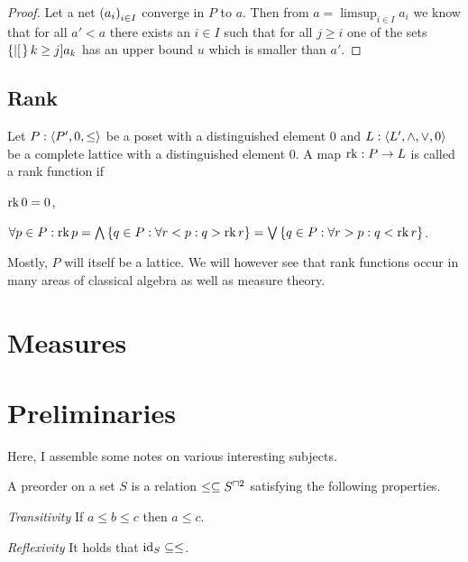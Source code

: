 \documentclass[8pt,a4paper]{article}
\begin{document}
\begin{proof}
    Let a net $\net[i\in I]{a_i}$ converge in $P$ to $a$. Then from $a=\limsup_{i\in I}{a_i}$ we know that for all $a'<a$ there exists an $i\in I$ such that for all $j\geq i$ one of the sets $\set[k\geq j]{a_k}$ has an upper bound $u$ which is smaller than $a'$.
\end{proof}



\subsection{Rank}

\begin{definition}
    Let $P:\struct{P',0,\leq}$ be a poset with a distinguished element 0 and $L:\struct{L',\meet,\join,0}$ be a complete lattice with a distinguished element 0.
    A map $\mathop\mathrm{rk}:P\rightarrow L$ is called a rank function if
    \begin{properties}
            \item $\mathop\mathrm{rk}{0}=0$,
            \item $\forall p\in P: \rk{p}=\Meet\set{q\in P:\forall r<p: q>\rk{r}}=\Join\set{q\in P:\forall r>p: q<\rk{r}}$.
    \end{properties}
\end{definition}

\begin{remark}
    Mostly, $P$ will itself be a lattice. We will however see that rank functions occur in many areas of classical algebra as well as measure theory.
\end{remark}



\section{Measures}



\section{Preliminaries}

Here, I assemble some notes on various interesting subjects.

\begin{definition}[preorder]
    A preorder on a set $S$ is a relation $\leq\setleq S^{\setprod2}$ satisfying the following properties.
    \begin{statements}
            \item \emph{Transitivity} If $a\leq b\leq c$ then $a\leq c$.
            \item \emph{Reflexivity} It holds that $\mathop\mathrm{id}\nolimits_S\subseteq \leq$. 
    \end{statements}
\end{definition}
\end{document}

